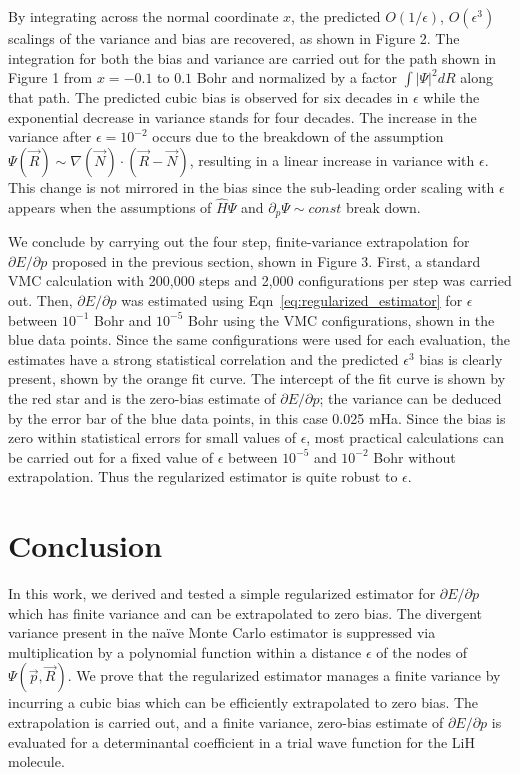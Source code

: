 \documentclass[twocolumn]{revtex4-1}
\begin{document}
By integrating across the normal coordinate $x$, the predicted $O(1/\epsilon)$, $O(\epsilon^3)$ scalings of the variance and bias are recovered, as shown in Figure 2.
The integration for both the bias and variance are carried out for the path shown in Figure 1 from $x = -0.1$ to $0.1$ Bohr and normalized by a factor $\int |\Psi|^2 dR$ along that path.
The predicted cubic bias is observed for six decades in $\epsilon$ while the exponential decrease in variance stands for four decades.
The increase in the variance after $\epsilon = 10^{-2}$ occurs due to the breakdown of the assumption $\Psi(\vec{R}) \sim \nabla(\vec{N}) \cdot (\vec{R}-\vec{N})$, resulting in a linear increase in variance with $\epsilon$.
This change is not mirrored in the bias since the sub-leading order scaling with $\epsilon$ appears when the assumptions of $\hat{H}\Psi$ and $\partial_p \Psi \sim const$ break down.

We conclude by carrying out the four step, finite-variance extrapolation for $\partial E/\partial p$ proposed in the previous section, shown in Figure 3.
First, a standard VMC calculation with 200,000 steps and 2,000 configurations per step was carried out.
Then, $\partial E/\partial p$ was estimated using Eqn~\ref{eq:regularized_estimator} for $\epsilon$ between $10^{-1}$ Bohr and $10^{-5}$ Bohr using the VMC configurations, shown in the blue data points.
Since the same configurations were used for each evaluation, the estimates have a strong statistical correlation and the predicted $\epsilon^3$ bias is clearly present, shown by the orange fit curve.
The intercept of the fit curve is shown by the red star and is the zero-bias estimate of $\partial E/\partial p$; the variance can be deduced by the error bar of the blue data points, in this case 0.025 mHa.
Since the bias is zero within statistical errors for small values of $\epsilon$, most practical calculations can be carried out for a fixed value of $\epsilon$ between $10^{-5}$ and $10^{-2}$ Bohr without extrapolation.
Thus the regularized estimator is quite robust to $\epsilon$.

\section{Conclusion}
In this work, we derived and tested a simple regularized estimator for $\partial E/\partial p$ which has finite variance and can be extrapolated to zero bias.
The divergent variance present in the na\"ive Monte Carlo estimator is suppressed via multiplication by a polynomial function within a distance $\epsilon$ of the nodes of $\Psi(\vec{p}, \vec{R})$. 
We prove that the regularized estimator manages a finite variance by incurring a cubic bias which can be efficiently extrapolated to zero bias.
The extrapolation is carried out, and a finite variance, zero-bias estimate of $\partial E/\partial p$ is evaluated for a determinantal coefficient in a trial wave function for the LiH molecule.
\end{document}
